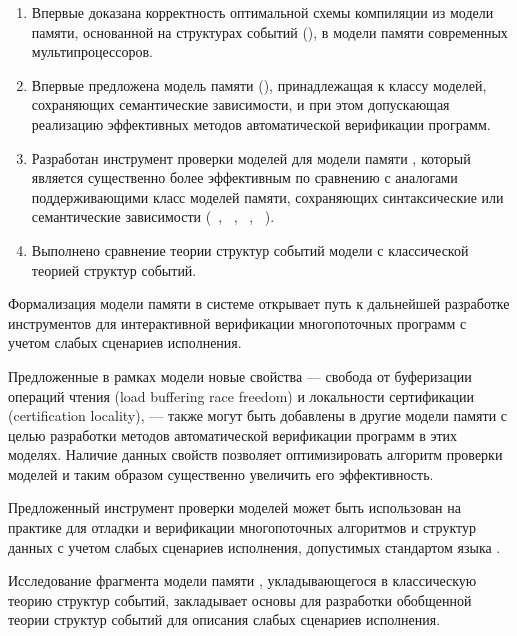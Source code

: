 {\novelty}
\begin{enumerate}[beginpenalty=10000] %

  \item Впервые доказана корректность оптимальной схемы компиляции
    из модели памяти, основанной на структурах событий (\Wkm), 
    в модели памяти современных мультипроцессоров.

  \item Впервые предложена модель памяти (\WkmS),
    принадлежащая к классу моделей, сохраняющих семантические зависимости, 
    и при этом допускающая реализацию эффективных методов автоматической верификации программ. 

  \item Разработан инструмент проверки моделей \wmc для модели памяти \WkmS,
    который является существенно более эффективным по сравнению с аналогами 
    поддерживающими класс моделей памяти, 
    сохраняющих синтаксические или семантические зависимости
    (\hmc~\autocite{Kokologiannakis-Vafeiadis:ASPLOS2020},
     \rmem~\autocite{Pulte-al:PLDI2019},
     \Nidhugg~\autocite{Abdulla-al:TACAS2015,Abdulla-al:CAV2016},
     \CDSChecker~\autocite{Norris-Demsky:OOPSLA2013}).

  \item Выполнено сравнение теории структур событий модели \Wkm
    с классической теорией структур событий.

\end{enumerate}

{\influence}
Формализация модели памяти \Wkm в системе \coq открывает 
путь к дальнейшей разработке инструментов для  
интерактивной верификации многопоточных программ  
с учетом слабых сценариев исполнения.

Предложенные в рамках модели  \WkmS новые свойства ---
свобода от буферизации операций чтения (load buffering race freedom)
и локальности сертификации (certification locality), --- 
также могут быть добавлены в другие модели памяти 
с целью разработки методов автоматической верификации программ в этих моделях. 
Наличие данных свойств позволяет оптимизировать алгоритм 
проверки моделей и таким образом существенно увеличить его эффективность.

Предложенный инструмент проверки моделей может быть использован на практике
для отладки и верификации многопоточных алгоритмов и структур данных 
с учетом слабых сценариев исполнения, допустимых стандартом языка \CLANG.

Исследование фрагмента модели памяти \Wkm, укладывающегося в
классическую теорию структур событий, закладывает основы
для разработки обобщенной теории структур событий для
описания слабых сценариев исполнения. 

